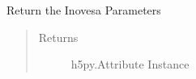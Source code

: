 \documentclass[letterpaper,10pt,openany,oneside,english]{sphinxmanual}
\begin{document}
\begin{fulllineitems}
\begin{fulllineitems}
\end{fulllineitems}


\begin{fulllineitems}
\label{\detokenize{file:file.File_dep.parameters}}
Return the Inovesa Parameters
\begin{quote}\begin{description}
\item[{Returns}] \leavevmode
h5py.Attribute Instance

\end{description}\end{quote}

\end{fulllineitems}


\end{fulllineitems}

\end{document}
